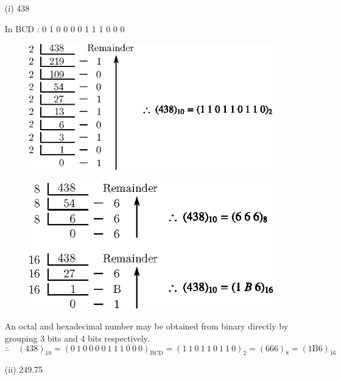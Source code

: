 \begin{solution}
\begin{itemize}
\item[(i)] 438

In BCD : 0 1 0 0 0 0 1 1 1 0 0 0
\begin{figure}[H]
\centering
\includegraphics{chap5/div56.eps}
\end{figure}
\begin{figure}[H]
\centering
\includegraphics{chap5/div56a.eps}
\end{figure}

An octal and hexadecimal number may be obtained from binary directly by grouping 3 bits and 4 bits respectively.
$$
\therefore\quad (438)_{10}=(0~1~0~0~0~0~1~1~1~0~0~0)_{\text{BCD}}=(1~1~0~1~1~0~1~1~0)_{2}=(666)_{8}=(1\text{B}6)_{16}
$$

\item[(ii)] 249.75


\end{itemize}
\end{solution}
